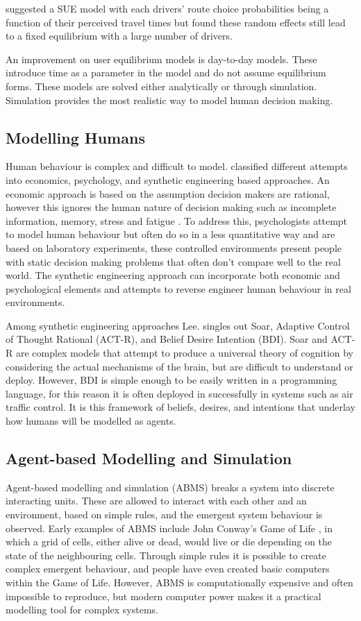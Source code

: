 \documentclass[12pt, a4paper, onecolumn]{article}
\begin{document}
\cite{Daganzo1977} suggested a SUE model with each drivers' route choice probabilities being a function of their perceived travel times but found these random effects still lead to a fixed equilibrium with a large number of drivers.

An improvement on user equilibrium models is day-to-day models. These introduce time as a parameter in the model and do not assume equilibrium forms. These models are solved either analytically or through simulation. Simulation provides the most realistic way to model human decision making.

\subsection{Modelling Humans}
Human behaviour is complex and difficult to model. \cite{Lee2010} classified different attempts into economics, psychology, and synthetic engineering based approaches. An economic approach is based on the assumption decision makers are rational, however this ignores the human nature of decision making such as incomplete information, memory, stress and fatigue \citep{Zheng2013}. To address this, psychologists attempt to model human behaviour but often do so in a less quantitative way and are based on laboratory experiments, these controlled environments present people with static decision making problems that often don't compare well to the real world. The synthetic engineering approach can incorporate both economic and psychological elements and attempts to reverse engineer human behaviour in real environments.

Among synthetic engineering approaches Lee. singles out Soar, Adaptive Control of Thought Rational (ACT-R), and Belief Desire Intention (BDI). Soar and ACT-R are complex models that attempt to produce a universal theory of cognition by considering the actual mechanisms of the brain, but are difficult to understand or deploy. However, BDI is simple enough to be easily written in a programming language, for this reason it is often deployed in successfully in systems such as air traffic control. It is this framework of beliefs, desires, and intentions that underlay how humans will be modelled as agents.

\subsection{Agent-based Modelling and Simulation}
Agent-based modelling and simulation (ABMS) breaks a system into discrete interacting units. These are allowed to interact with each other and an environment, based on simple rules, and the emergent system behaviour is observed. Early examples of ABMS include John Conway's Game of Life \citep{Gardner1970}, in which a grid of cells, either alive or dead, would live or die depending on the state of the neighbouring cells. Through simple rules it is possible to create complex emergent behaviour, and people have even created basic computers within the Game of Life. However, ABMS is computationally expensive and often impossible to reproduce, but modern computer power makes it a practical modelling tool for complex systems.
\end{document}
